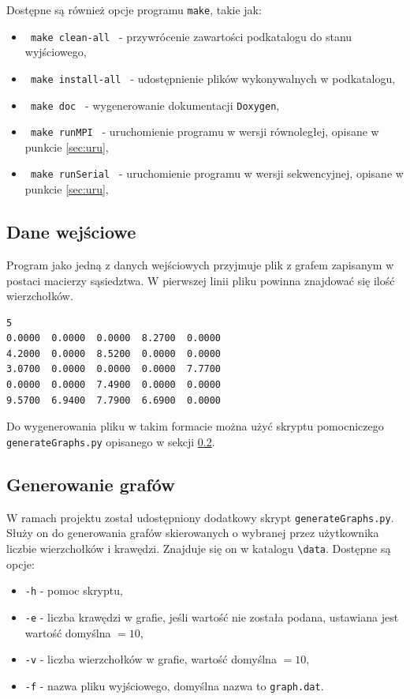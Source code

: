 \documentclass[12pt]{article}
\begin{document}
\noindent
Dostępne są również opcje programu \lstinline|make|, takie jak:
\begin{itemize}
\item \lstinline| make clean-all | - przywrócenie zawartości podkatalogu do stanu wyjściowego,
\item \lstinline| make install-all | - udostępnienie plików wykonywalnych w podkatalogu,
\item \lstinline| make doc |  - wygenerowanie dokumentacji \lstinline|Doxygen|,
\item \lstinline| make runMPI |  - uruchomienie programu w wersji równoległej, opisane w punkcie \ref{sec:uru},
\item \lstinline| make runSerial |  - uruchomienie programu w wersji sekwencyjnej, opisane w punkcie  \ref{sec:uru},
\end{itemize}

\subsection{Dane wejściowe}
Program jako jedną z danych wejściowych przyjmuje plik z grafem zapisanym w postaci macierzy sąsiedztwa.
W pierwszej linii pliku powinna znajdować się ilość wierzchołków.

\begin{lstlisting}[caption={Przykładowy graf zapisany w odpowiednim formacie.}, captionpos=b ]
5
0.0000  0.0000  0.0000  8.2700  0.0000
4.2000  0.0000  8.5200  0.0000  0.0000
3.0700  0.0000  0.0000  0.0000  7.7700
0.0000  0.0000  7.4900  0.0000  0.0000
9.5700  6.9400  7.7900  6.6900  0.0000
\end{lstlisting}

Do wygenerowania pliku w takim formacie można użyć skryptu pomocniczego \lstinline|generateGraphs.py| opisanego w sekcji \ref{sec:gen_g}.

\subsection{Generowanie grafów} \label{sec:gen_g}
W ramach projektu został udostępniony dodatkowy skrypt  \lstinline|generateGraphs.py|. Służy on do generowania grafów skierowanych o wybranej przez użytkownika liczbie wierzchołków i krawędzi. Znajduje się on w katalogu \lstinline|\data|. Dostępne są opcje:
\begin{itemize}
\item \lstinline|-h| - pomoc skryptu,
\item \lstinline|-e| - liczba krawędzi w grafie, jeśli wartość nie została podana, ustawiana jest wartość domyślna $=10$,
\item \lstinline|-v| - liczba wierzchołków w grafie, wartość domyślna $=10$,
\item \lstinline|-f| - nazwa pliku wyjściowego, domyślna nazwa to \lstinline{graph.dat}.
\end{itemize}
\end{document}
